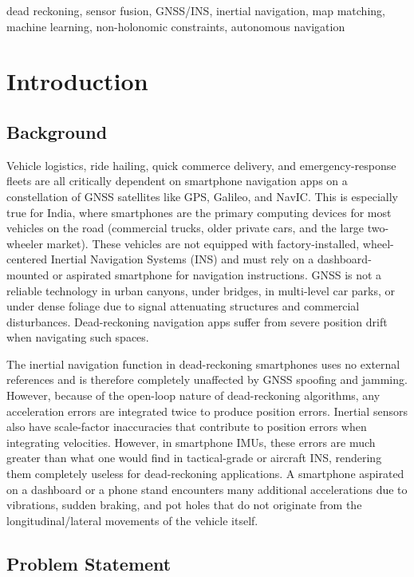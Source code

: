\documentclass[conference]{IEEEtran}
\begin{document}
\begin{IEEEkeywords}
dead reckoning, sensor fusion, GNSS/INS, inertial navigation, map matching, machine learning, non-holonomic constraints, autonomous navigation
\end{IEEEkeywords}

\section{Introduction}

\subsection{Background}

Vehicle logistics, ride hailing, quick commerce delivery, and emergency-response fleets are all critically dependent on smartphone navigation apps on a constellation of GNSS satellites like GPS, Galileo, and NavIC. This is especially true for India, where smartphones are the primary computing devices for most vehicles on the road (commercial trucks, older private cars, and the large two-wheeler market). These vehicles are not equipped with factory-installed, wheel-centered Inertial Navigation Systems (INS) and must rely on a dashboard-mounted or aspirated smartphone for navigation instructions. GNSS is not a reliable technology in urban canyons, under bridges, in multi-level car parks, or under dense foliage due to signal attenuating structures and commercial disturbances. Dead-reckoning navigation apps suffer from severe position drift when navigating such spaces.



The inertial navigation function in dead-reckoning smartphones uses no external references and is therefore completely unaffected by GNSS spoofing and jamming. However, because of the open-loop nature of dead-reckoning algorithms, any acceleration errors are integrated twice to produce position errors. Inertial sensors also have scale-factor inaccuracies that contribute to position errors when integrating velocities. However, in smartphone IMUs, these errors are much greater than what one would find in tactical-grade or aircraft INS, rendering them completely useless for dead-reckoning applications. A smartphone aspirated on a dashboard or a phone stand encounters many additional accelerations due to vibrations, sudden braking, and pot holes that do not originate from the longitudinal/lateral movements of the vehicle itself.

\subsection{Problem Statement}
\end{document}
